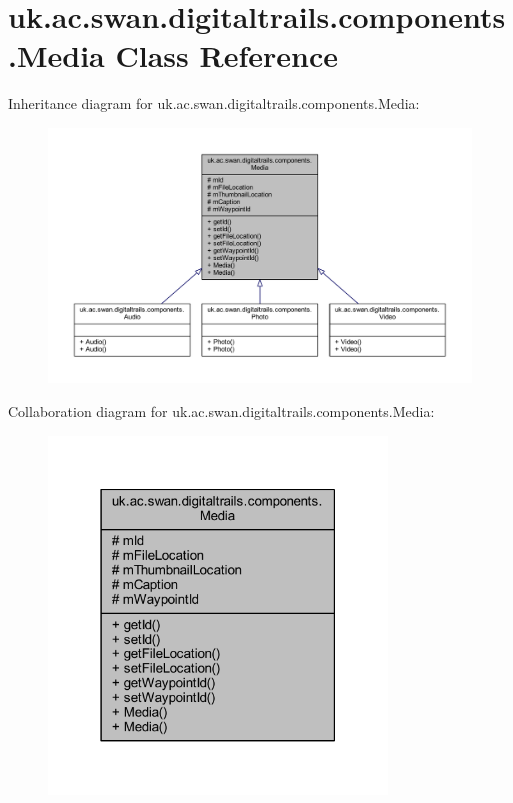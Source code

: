 \hypertarget{classuk_1_1ac_1_1swan_1_1digitaltrails_1_1components_1_1_media}{\section{uk.\+ac.\+swan.\+digitaltrails.\+components.\+Media Class Reference}
\label{classuk_1_1ac_1_1swan_1_1digitaltrails_1_1components_1_1_media}
}


Inheritance diagram for uk.\+ac.\+swan.\+digitaltrails.\+components.\+Media\+:
\nopagebreak
\begin{figure}[H]
\begin{center}
\leavevmode
\includegraphics[width=350pt]{classuk_1_1ac_1_1swan_1_1digitaltrails_1_1components_1_1_media__inherit__graph}
\end{center}
\end{figure}


Collaboration diagram for uk.\+ac.\+swan.\+digitaltrails.\+components.\+Media\+:
\nopagebreak
\begin{figure}[H]
\begin{center}
\leavevmode
\includegraphics[width=255pt]{classuk_1_1ac_1_1swan_1_1digitaltrails_1_1components_1_1_media__coll__graph}
\end{center}
\end{figure}
